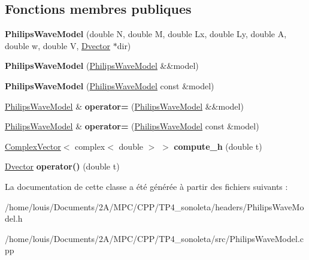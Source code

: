 \subsection*{Fonctions membres publiques}
\begin{DoxyCompactItemize}
\item 
\mbox{\label{class_philips_wave_model_a60f5d83189f3b921590473d4fc993615}} 
{\bfseries Philips\+Wave\+Model} (double N, double M, double Lx, double Ly, double A, double w, double V, \hyperlink{class_dvector}{Dvector} $\ast$dir)
\item 
\mbox{\label{class_philips_wave_model_af7d8e1c33f38a72f4d676077a19cfbc5}} 
{\bfseries Philips\+Wave\+Model} (\hyperlink{class_philips_wave_model}{Philips\+Wave\+Model} \&\&model)
\item 
\mbox{\label{class_philips_wave_model_aea64696ac943afe8952ea401c954236e}} 
{\bfseries Philips\+Wave\+Model} (\hyperlink{class_philips_wave_model}{Philips\+Wave\+Model} const \&model)
\item 
\mbox{\label{class_philips_wave_model_a605fbc40c74a9fc4c2d461a33d441b6c}} 
\hyperlink{class_philips_wave_model}{Philips\+Wave\+Model} \& {\bfseries operator=} (\hyperlink{class_philips_wave_model}{Philips\+Wave\+Model} \&\&model)
\item 
\mbox{\label{class_philips_wave_model_a396de399ac5a72bd09bf3dc583ddce1e}} 
\hyperlink{class_philips_wave_model}{Philips\+Wave\+Model} \& {\bfseries operator=} (\hyperlink{class_philips_wave_model}{Philips\+Wave\+Model} const \&model)
\item 
\mbox{\label{class_philips_wave_model_ae973584a7a495c53df068f474d6011fe}} 
\hyperlink{class_complex_vector}{Complex\+Vector}$<$ complex$<$ double $>$ $>$ {\bfseries compute\+\_\+h} (double t)
\item 
\mbox{\label{class_philips_wave_model_a0c15316c6ebc65730f97b34d751faca8}} 
\hyperlink{class_dvector}{Dvector} {\bfseries operator()} (double t)
\end{DoxyCompactItemize}


La documentation de cette classe a été générée à partir des fichiers suivants \+:\begin{DoxyCompactItemize}
\item 
/home/louis/\+Documents/2\+A/\+M\+P\+C/\+C\+P\+P/\+T\+P4\+\_\+sonoleta/headers/Philips\+Wave\+Model.\+h\item 
/home/louis/\+Documents/2\+A/\+M\+P\+C/\+C\+P\+P/\+T\+P4\+\_\+sonoleta/src/Philips\+Wave\+Model.\+cpp\end{DoxyCompactItemize}
